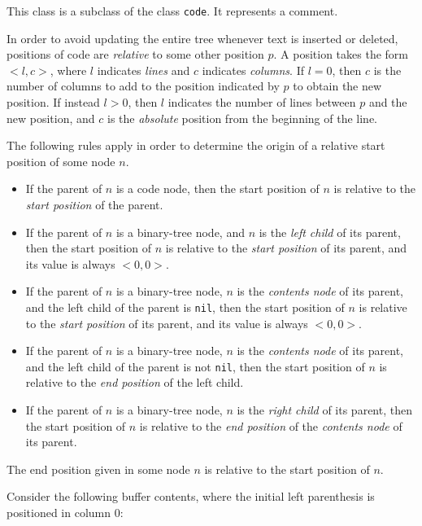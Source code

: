 
This class is a subclass of the class \texttt{code}.  It represents a
\commonlisp{} comment.

In order to avoid updating the entire tree whenever text is inserted
or deleted, positions of code are \emph{relative} to some other
position $p$.  A position takes the form $<l,c>$, where $l$ indicates
\emph{lines} and $c$ indicates \emph{columns}.  If $l = 0$, then $c$
is the number of columns to add to the position indicated by $p$ to
obtain the new position.  If instead $l > 0$, then $l$ indicates the
number of lines between $p$ and the new position, and $c$ is the
\emph{absolute} position from the beginning of the line.

The following rules apply in order to determine the origin of a
relative start position of some node $n$.

\begin{itemize}
\item If the parent of $n$ is a code node, then the start position of
  $n$ is relative to the \emph{start position} of the parent.
\item If the parent of $n$ is a binary-tree node, and $n$ is the
  \emph{left child} of its parent, then the start position of $n$ is
  relative to the \emph{start position} of its parent, and its value is
  always $<0,0>$.
\item If the parent of $n$ is a binary-tree node, $n$ is the
  \emph{contents node} of its parent, and the left child of the parent
  is \texttt{nil}, then the start position of $n$ is relative to the
  \emph{start position} of its parent, and its value is always
  $<0,0>$.
\item If the parent of $n$ is a binary-tree node, $n$ is the
  \emph{contents node} of its parent, and the left child of the parent
  is not \texttt{nil}, then the start position of $n$ is relative to
  the \emph{end position} of the left child.
\item If the parent of $n$ is a binary-tree node, $n$ is the
  \emph{right child} of its parent, then the start position of $n$ is
  relative to the \emph{end position} of the \emph{contents node} of
  its parent.
\end{itemize}

The end position given in some node $n$ is relative to the start
position of $n$.

Consider the following buffer contents, where the initial left
parenthesis is positioned in column $0$:

